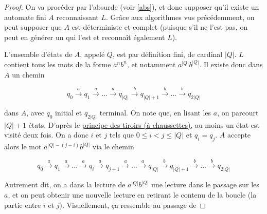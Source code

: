 \begin{proof}
On va procéder par l'absurde (voir \ref{abs}), et donc supposer qu'il existe un automate fini $A$ reconnaissant $L$. Grâce aux algorithmes vus précédemment, on peut supposer que $A$ est déterministe et complet (puisque s'il ne l'est pas, on peut en générer un qui l'est et reconnaît également $L$).

L'ensemble d'états de $A$, appelé $Q$, est par définition fini, de cardinal $|Q|$. $L$ contient tous les mots de la forme $a^nb^n$, et notamment $a^{|Q|}b^{|Q|}$. Il existe donc dans $A$ un chemin 

\[
q_0 \xrightarrow{a} q_1 \xrightarrow{a} ... \xrightarrow{a} q_{|Q|} \xrightarrow{b} q_{|Q|+1} \xrightarrow{b} ... \xrightarrow{b} q_{2|Q|}
\]

dans $A$, avec $q_0$ initial et $q_{2|Q|}$ terminal. On note que, en lisant les $a$, on parcourt $|Q|+1$ états. D'après le \href{https://fr.wikipedia.org/wiki/Principe_des_tiroirs}{principe des tiroirs (à chaussettes)}, au moins un état est visité deux fois. On a donc $i$ et $j$ tels que $0 \leq i < j \leq |Q|$ et $q_i = q_j$. $A$ accepte alors le mot $a^{|Q|-(j-i)}b^{|Q|}$ via le chemin

\[
q_0 \xrightarrow{a} q_1 \xrightarrow{a} ... \xrightarrow{a} q_{i} \xrightarrow{a} q_{j+1} \xrightarrow{a} ... \xrightarrow{a} q_{|Q|} \xrightarrow{b} q_{|Q|+1} \xrightarrow{b} ... \xrightarrow{b} q_{2|Q|}
\]

Autrement dit, on a dans la lecture de $a^{|Q|}b^{|Q|}$ une lecture dans le passage sur les $a$, et on peut obtenir une nouvelle lecture en retirant le contenu de la boucle (la partie entre $i$ et $j$). Visuellement, ça ressemble au passage de 

\hspace{-1.5cm}
\end{proof}

